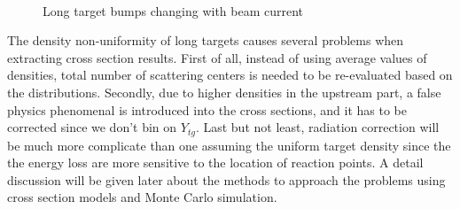 \documentclass[a4paper,10.5pt]{report}
\begin{document}
\begin{figure}[!ht]
 \begin{center}
\hfill
\\
 \caption[Long target bumps changing with beam current]{Long target bumps changing with beam current}
 \label{bump_current}
\end{center}
\end{figure}

The density non-uniformity of long targets causes several problems when extracting cross section results. First of all, instead of using average values of densities, total number of scattering centers is needed to be re-evaluated based on the distributions. Secondly, due to higher densities in the upstream part, a false physics phenomenal is introduced into the cross sections, and it has to be corrected since we don't bin on $Y_{tg}$. Last but not least, radiation correction will be much more complicate than one assuming the uniform target density since the the energy loss are more sensitive to the location of reaction points. A detail discussion will be given later about the methods to approach the problems using cross section models and Monte Carlo simulation.
\end{document}
